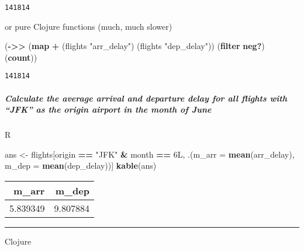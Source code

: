 \documentclass[]{article}
\newenvironment{Shaded}{\begin{snugshade}}{\end{snugshade}}
\newcommand{\KeywordTok}[1]{\textcolor[rgb]{0.13,0.29,0.53}{\textbf{#1}}}
\newcommand{\DataTypeTok}[1]{\textcolor[rgb]{0.13,0.29,0.53}{#1}}
\newcommand{\StringTok}[1]{\textcolor[rgb]{0.31,0.60,0.02}{#1}}
\newcommand{\OperatorTok}[1]{\textcolor[rgb]{0.81,0.36,0.00}{\textbf{#1}}}
\newcommand{\NormalTok}[1]{#1}
\let\oldsubparagraph\subparagraph
\renewcommand{\subparagraph}[1]{\oldsubparagraph{#1}\mbox{}}
\begin{document}
\begin{verbatim}
141814
\end{verbatim}

or pure Clojure functions (much, much slower)

\begin{Shaded}
\begin{Highlighting}[]
\NormalTok{(}\KeywordTok{->>}\NormalTok{ (}\KeywordTok{map} \KeywordTok{+}\NormalTok{ (flights }\StringTok{"arr_delay"}\NormalTok{) (flights }\StringTok{"dep_delay"}\NormalTok{))}
\NormalTok{     (}\KeywordTok{filter} \KeywordTok{neg?}\NormalTok{)}
\NormalTok{     (}\KeywordTok{count}\NormalTok{))}
\end{Highlighting}
\end{Shaded}

\begin{verbatim}
141814
\end{verbatim}

\subparagraph{\texorpdfstring{Calculate the average arrival and
departure delay for all flights with ``JFK'' as the origin airport in
the month of
June}{Calculate the average arrival and departure delay for all flights with JFK as the origin airport in the month of June}}\label{calculate-the-average-arrival-and-departure-delay-for-all-flights-with-jfk-as-the-origin-airport-in-the-month-of-june}

R

\begin{Shaded}
\begin{Highlighting}[]
\NormalTok{ans <-}\StringTok{ }\NormalTok{flights[origin }\OperatorTok{==}\StringTok{ "JFK"} \OperatorTok{&}\StringTok{ }\NormalTok{month }\OperatorTok{==}\StringTok{ }\NormalTok{6L,}
\NormalTok{               .(}\DataTypeTok{m_arr =} \KeywordTok{mean}\NormalTok{(arr_delay), }\DataTypeTok{m_dep =} \KeywordTok{mean}\NormalTok{(dep_delay))]}
\KeywordTok{kable}\NormalTok{(ans)}
\end{Highlighting}
\end{Shaded}

\begin{longtable}[]{@{}rr@{}}
\toprule
m\_arr & m\_dep\tabularnewline
\midrule
\endhead
5.839349 & 9.807884\tabularnewline
\bottomrule
\end{longtable}

\begin{center}\rule{0.5\linewidth}{0.5pt}\end{center}

Clojure
\end{document}

